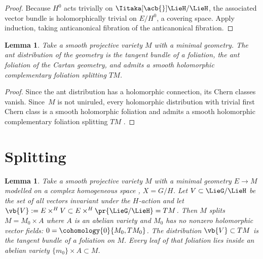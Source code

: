 \documentclass[10pt,a4paper]{amsart}
\numberwithin{equation}{section}
\newtheorem{Lemma}[Theorem]{Lemma}
\newcommand*{\acf}[1]{\Iitaka[\acb{}]{#1}}
\begin{document}
\begin{proof}
Because $H^0$ acts trivially on $\acf\LieH/\LieH$, the associated vector bundle is
holomorphically trivial on $E/H^0$, a covering space.
Apply induction, taking anticanonical fibration of the anticanonical fibration.
\end{proof}

\begin{Lemma}
Take a smooth projective variety $M$ with a minimal geometry.
The ant distribution of the geometry is the tangent bundle of a foliation, the \emph{ant foliation} of the Cartan geometry, and admits a smooth holomorphic complementary foliation splitting $TM$.
\end{Lemma}

\begin{proof}
Since the ant distribution has a holomorphic connection, its Chern classes vanish.
Since~$M$ is not uniruled, every holomorphic distribution with trivial first Chern class is a smooth holomorphic foliation and admits a smooth holomorphic complementary foliation splitting $TM$ \cite[Theorem 5.2]{Loray/Pereira/Touzet:2011}.
\end{proof}

\section{Splitting}\label{section:splitting}

\begin{Lemma}\label{lemma:symmetry.splitting}
Take a smooth projective variety $M$ with a minimal geometry $E \to M$ modelled on a complex homogeneous space , $X = G/H$.
Let $V \subset \LieG/\LieH$ be the set of all vectors invariant under the $H$-action and let $\vb{V}:= E \times^H V \subset E \times^H \pr{\LieG/\LieH} = TM$.
Then $M$ splits~${M = M_0 \times A}$ where $A$ is an abelian variety and $M_0$ has no nonzero holomorphic vector fields: $0=\cohomology{0}{M_0,TM_0}$.
The distribution $\vb{V} \subset TM$ is the tangent bundle of a foliation on $M$.
Every leaf of that foliation lies inside an abelian variety $\{m_0\} \times A \subset M$.
\end{Lemma}
\end{document}
